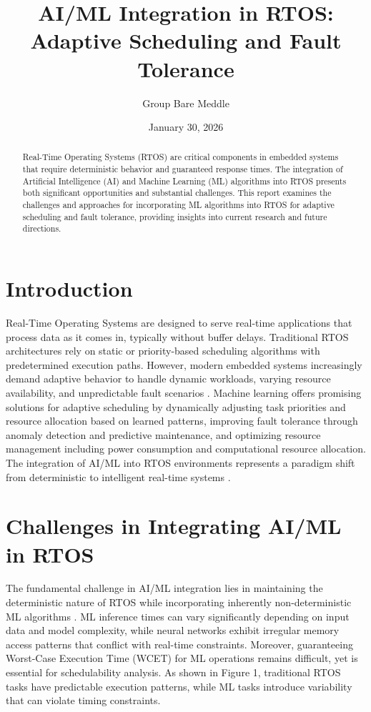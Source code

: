 \documentclass[11pt,a4paper]{article}
\title{\textbf{AI/ML Integration in RTOS: Adaptive Scheduling and Fault Tolerance}}
\author{Group Bare Meddle}
\date{January 30, 2026}
\begin{document}
\maketitle

\begin{abstract}
Real-Time Operating Systems (RTOS) are critical components in embedded systems that require deterministic behavior and guaranteed response times. The integration of Artificial Intelligence (AI) and Machine Learning (ML) algorithms into RTOS presents both significant opportunities and substantial challenges. This report examines the challenges and approaches for incorporating ML algorithms into RTOS for adaptive scheduling and fault tolerance, providing insights into current research and future directions.
\end{abstract}

\section{Introduction}

Real-Time Operating Systems are designed to serve real-time applications that process data as it comes in, typically without buffer delays. Traditional RTOS architectures rely on static or priority-based scheduling algorithms with predetermined execution paths. However, modern embedded systems increasingly demand adaptive behavior to handle dynamic workloads, varying resource availability, and unpredictable fault scenarios \cite{buttazzo2011hard}. Machine learning offers promising solutions for adaptive scheduling by dynamically adjusting task priorities and resource allocation based on learned patterns, improving fault tolerance through anomaly detection and predictive maintenance, and optimizing resource management including power consumption and computational resource allocation. The integration of AI/ML into RTOS environments represents a paradigm shift from deterministic to intelligent real-time systems \cite{lee2017introduction, gracias2025leveraging}.

\section{Challenges in Integrating AI/ML in RTOS}

The fundamental challenge in AI/ML integration lies in maintaining the deterministic nature of RTOS while incorporating inherently non-deterministic ML algorithms \cite{kopetz2011real}. ML inference times can vary significantly depending on input data and model complexity, while neural networks exhibit irregular memory access patterns that conflict with real-time constraints. Moreover, guaranteeing Worst-Case Execution Time (WCET) for ML operations remains difficult, yet is essential for schedulability analysis. As shown in Figure 1, traditional RTOS tasks have predictable execution patterns, while ML tasks introduce variability that can violate timing constraints.
\end{document}
